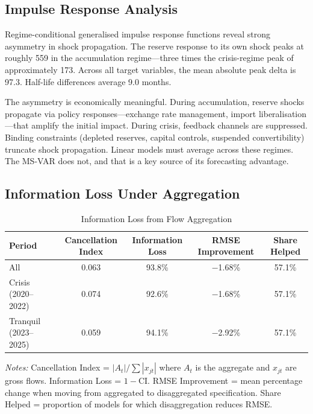\documentclass[12pt,a4paper]{article}
\begin{document}
\subsection{Impulse Response Analysis}

Regime-conditional generalised impulse response functions reveal strong asymmetry in shock propagation. The reserve response to its own shock peaks at roughly 559 in the accumulation regime---three times the crisis-regime peak of approximately 173. Across all target variables, the mean absolute peak delta is 97.3. Half-life differences average 9.0 months.

The asymmetry is economically meaningful. During accumulation, reserve shocks propagate via policy responses---exchange rate management, import liberalisation---that amplify the initial impact. During crisis, feedback channels are suppressed. Binding constraints (depleted reserves, capital controls, suspended convertibility) truncate shock propagation. Linear models must average across these regimes. The MS-VAR does not, and that is a key source of its forecasting advantage.

\subsection{Information Loss Under Aggregation}

\begin{table}[htbp]
\centering
\caption{Information Loss from Flow Aggregation}
\label{tab:info_loss}
\begin{tabular}{lcccc}
\toprule
Period & Cancellation Index & Information Loss & RMSE Improvement & Share Helped \\
\midrule
All & 0.063 & 93.8\% & $-$1.68\% & 57.1\% \\
Crisis (2020--2022) & 0.074 & 92.6\% & $-$1.68\% & 57.1\% \\
Tranquil (2023--2025) & 0.059 & 94.1\% & $-$2.92\% & 57.1\% \\
\bottomrule
\end{tabular}
\begin{tablenotes}
\small
\item \textit{Notes:} Cancellation Index = $|A_t|/\sum|x_{jt}|$ where $A_t$ is the aggregate and $x_{jt}$ are gross flows. Information Loss = $1 - \text{CI}$. RMSE Improvement = mean percentage change when moving from aggregated to disaggregated specification. Share Helped = proportion of models for which disaggregation reduces RMSE.
\end{tablenotes}
\end{table}
\end{document}
